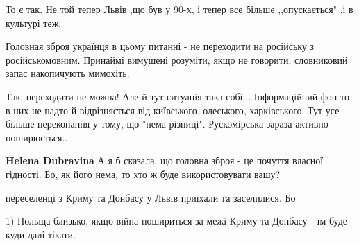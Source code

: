 \begin{itemize}
 
То є так. Не той тепер Львів ,що був у 90-х, і тепер все більше ,,опускається" ,і в культурі теж.

 

Головная зброя українця в цьому питанні - не переходити на російську з
російськомовним. Принаймі вимушені розуміти, якщо не говорити, словниковий запас
накопичують мимохіть.

\begin{itemize}
 

Так, переходити не можна! Але й тут ситуація така собі... Інформаційний фон то
в них не надто й відрізняється від київського, одеського, харківського. Тут усе
більше переконання у тому, що "нема різниці". Рускомірська зараза активно
поширюється..


 
\textbf{Helena Dubravina} А я б сказала, що головна зброя - це почуття власної
гідності. Бо, як його нема, то хто ж буде використовувати вашу?
\end{itemize}

 

переселенці з Криму та Донбасу у Львів приїхали та заселилися. Бо 

1) Польща близько, якщо війна пошириться за межі Криму та Донбасу - їм буде
куди далі тікати. 


\end{itemize}
